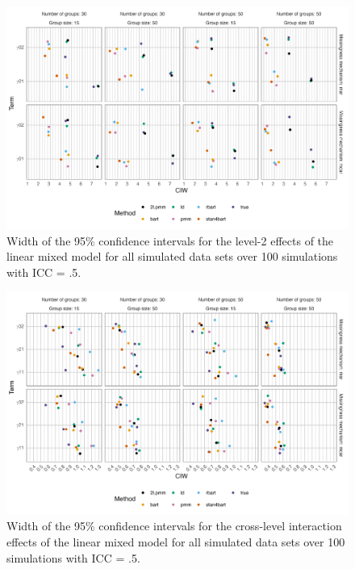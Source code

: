 \documentclass[10pt, a4paper, titlepage]{article}
\begin{document}
\begin{figure}[H]
    \centering
    \includegraphics[width=1\textwidth]{ciwlevel2.png}
    \caption{Width of the 95\% confidence intervals for the level-2 effects of the linear mixed model for all simulated data sets over 100 simulations with ICC = .5.}
    \label{fig:ciwlevel2}
\end{figure}

\begin{figure}[H]
    \centering
    \includegraphics[width=1\textwidth]{ciwcrosslevel.png}
    \caption{Width of the 95\% confidence intervals for the cross-level interaction effects of the linear mixed model for all simulated data sets over 100 simulations with ICC = .5.}
    \label{fig:ciwcrosslevel}
\end{figure}
\end{document}
